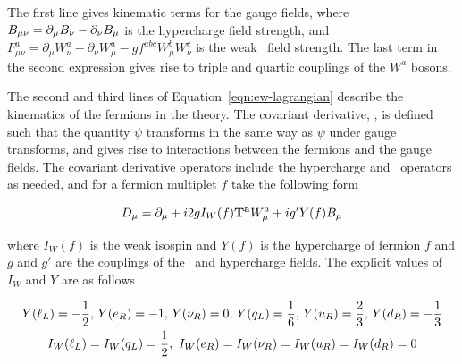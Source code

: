 The first line gives kinematic terms for the gauge fields, where $ B_{\mu\nu} =
\partial_{\mu} B_{\nu} - \partial_{\nu} B_{\mu}$ is the hypercharge field strength,
and  $ F^{a}_{\mu\nu} =
\partial_{\mu} W^{a}_{\nu} - \partial_{\nu} W^{a}_{\mu} - g f^{abc} W^{b}_{\mu}
W^{c}_{\nu}$ is the weak \sutwo\ field strength. The last term in the second
expression gives rise to triple and quartic couplings of the $W^{a}$ bosons.

The second and third lines of Equation~\ref{eqn:ew-lagrangian} describe the
kinematics of the fermions in the theory. The covariant derivative, \Dmu, is
defined such that the quantity \Dmu$\psi$ transforms in the same way as $\psi$
under gauge transforms, and gives rise to interactions between the
fermions and the gauge fields. The covariant derivative operators include the
hypercharge and \sutwo\ operators as needed, and for a fermion multiplet $f$
take the following form

\begin{equation}
D_{\mu}  =  \partial_{\mu} + i2gI_{W}(f)\mathbf{T^{a}} W_{\mu}^{a} + ig'Y(f)B_{\mu}
\label{eqn:ew-covariant-derivative}
\end{equation}


where $I_{W}(f)$ is the weak isospin and $Y(f)$ is the
hypercharge of fermion $f$ and $g$ and $g'$ are the couplings of the \sutwo\ and
hypercharge fields. The explicit values of $I_{W}$ and $Y$ are as
follows

\begin{gather}
Y(\ell_{L}) = - \frac{1}{2},\, Y(e_{R}) = - 1,\, Y(\nu_{R}) =0,\, Y(q_{L}) = \frac{1}{6},\, Y(u_{R}) = \frac{2}{3},\, Y(d_{R}) = - \frac{1}{3} \\
I_{W}(\ell_{L}) = I_{W}(q_{L}) = \frac{1}{2}, \  I_{W}(e_{R}) = I_{W}(\nu_{R}) =  I_{W}(u_{R}) = I_{W}(d_{R}) = 0 
\label{eqn:hypercharges}
\end{gather}

